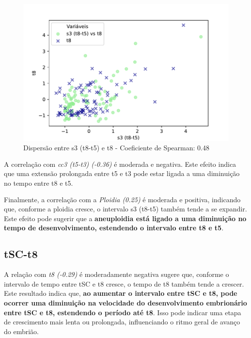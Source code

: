 \begin{figure}[h]
    \captionsetup{font=footnotesize, justification=centering, labelsep=period, position=above}
    \label{fig:s3-t8}
    \centering
    \includegraphics[scale=0.4]{figuras/Spearman/s3-t8.pdf}
    \caption{Dispersão entre s3 (t8-t5) e t8 - Coeficiente de Spearman: 0.48}
    \vspace{0.3cm} 
    \begin{minipage}{\linewidth}
        \centering
    \end{minipage}
\end{figure}
\FloatBarrier

A correlação com \textit{cc3 (t5-t3) (-0.36)} é moderada e negativa. Este efeito indica que uma extensão prolongada entre t5 e t3 pode estar ligada a uma diminuição no tempo entre t8 e t5.

Finalmente, a correlação com a \textit{Ploidia (0.25)} é moderada e positiva, indicando que, conforme a ploidia cresce, o intervalo s3 (t8-t5) também tende a se expandir. Este efeito pode sugerir que a \textbf{aneuploidia está ligado a uma diminuição no tempo de desenvolvimento, estendendo o intervalo entre t8 e t5}.

\subsection*{tSC-t8}
A relação com \textit{t8 (-0.29)} é moderadamente negativa sugere que, conforme o intervalo de tempo entre tSC e t8 cresce, o tempo de t8 também tende a crescer. Este resultado indica que,\textbf{ ao aumentar o intervalo entre tSC e t8, pode ocorrer uma diminuição na velocidade do desenvolvimento embrionário entre tSC e t8, estendendo o período até t8}. Isso pode indicar uma etapa de crescimento mais lenta ou prolongada, influenciando o ritmo geral de avanço do embrião.


